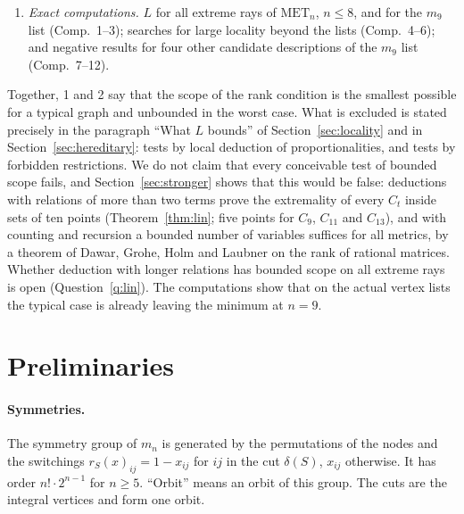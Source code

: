 \documentclass[11pt,a4paper]{article}
\theoremstyle{definition}
\theoremstyle{remark}
\newcommand{\MET}{\mathrm{MET}}
\begin{document}
\begin{enumerate}[leftmargin=*]
  terms, confined to sets of $s$ points, is sound and at least as strong as two-term deduction
  (Proposition~\ref{prop:lin}); it proves the extremality of every ray tested on the lists up to nine points with
  $s \le 5$, and that of $C_t$ with $s = 20$ for every $t$ tried. With
  counting and recursion, a bounded number of variables suffices for all metrics (Proposition~\ref{prop:fpc}).
\item \emph{Exact computations.} $L$ for all extreme rays of $\MET_n$, $n \le 8$, and for the $m_9$ list (Comp.~1--3);
  searches for large locality beyond the lists (Comp.~4--6); and negative results for four other candidate descriptions
  of the $m_9$ list (Comp.~7--12).
\end{enumerate}

Together, 1 and 2 say that the scope of the rank condition is the smallest possible for a typical graph and
unbounded in the worst case. What is excluded is stated precisely in the paragraph ``What $L$ bounds'' of
Section~\ref{sec:locality} and in Section~\ref{sec:hereditary}: tests by local deduction of proportionalities, and
tests by forbidden restrictions. We do not claim that every conceivable test of bounded scope fails, and Section~\ref{sec:stronger} shows that
this would be false: deductions with relations of more than two terms prove the extremality of every $C_t$
inside sets of ten points (Theorem~\ref{thm:lin}; five points for $C_9$, $C_{11}$ and $C_{13}$), and with counting and recursion a bounded number of variables suffices for all metrics, by a theorem
of Dawar, Grohe, Holm and Laubner on the rank of rational matrices. Whether deduction with longer relations has
bounded scope on all extreme rays is open (Question~\ref{q:lin}). The
computations show that on the actual vertex lists the typical case is already
leaving the minimum at $n = 9$.

\section{Preliminaries}

\paragraph{Symmetries.} The symmetry group of $m_n$ is generated by the permutations of the nodes and the switchings
$r_S(x)_{ij} = 1 - x_{ij}$ for $ij$ in the cut $\delta(S)$, $x_{ij}$ otherwise. It has order $n!\cdot 2^{n-1}$ for
$n \ge 5$. ``Orbit'' means an orbit of this group. The cuts are the integral vertices and form one orbit.
\end{document}
